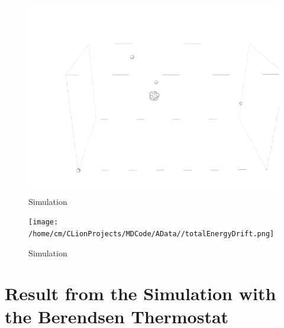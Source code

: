 \begin{figure}[!h]
	\begin{center}
		\includegraphics[scale= 1]{Figure/3Image.png}
	\end{center}
	\caption[Simulation]{Simulation }
	\label{SimulationSnapshot2}
\end{figure}


\begin{figure}[!h]
	\begin{center}
		\texttt{[image: /home/cm/CLionProjects/MDCode/AData//totalEnergyDrift.png]}
	\end{center}
	\caption[Simulation]{Simulation }
	\label{SimWithTimestep}
\end{figure}

\section{Result from the Simulation with the Berendsen Thermostat}

